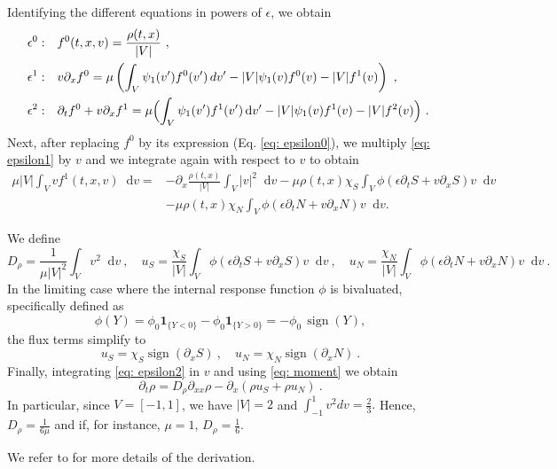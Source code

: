 \documentclass[11pt,twoside]{article}
\theoremstyle{nonumberplain}
\DeclareMathOperator{\sign}{sign}
\newcommand*\diff{\mathop{}\!\mathrm{d}}
\begin{document}
\noindent Identifying the different equations in powers of $\epsilon$, we obtain
\fi
\begin{align}
    \epsilon^0: & \quad f^0(t,{x},{v})=\frac{\rho(t,{x})}{|V|}\ ,\label{eq: epsilon0}\\
    \epsilon^1: & \quad 
    v \partial_x f^0
=
\mu \left(
\int_V \psi_1(v') f^0(v')\,dv'
- |V| \psi_1(v) f^0(v)
- |V| f^1(v)
\right)\ ,\label{eq: epsilon1}\\
    \epsilon^2: & \quad \partial_tf^0+{v}\partial_x f^1 =\mu\Bigl(\int_V\psi_1(v')f^1(v')\diff v'-|V|\psi_1(v)f^1(v)-|V|f^2(v)\Bigr) \ \label{eq: epsilon2}.\
\end{align}
Next, after replacing $f^0$ by its expression (Eq. \eqref{eq: epsilon0}), we multiply \eqref{eq: epsilon1} by ${v}$ and we integrate again with respect to ${v}$ to obtain
\begin{align}
    \mu|V|\int_V vf^1(t,x,v) \diff v=&-\partial_x\frac{\rho(t,x)}{|V|}\int_V |v|^2\diff v-\mu\rho(t,x)\chi_S\int_V\phi(\epsilon\partial_tS+v\partial_xS)v\diff v\nonumber\\ &-\mu\rho(t,x)\chi_N\int_V\phi(\epsilon\partial_tN+v\partial_xN)v\diff v.\label{eq: mean direction}
\end{align}

We define
\begin{equation}
D_\rho=\frac{1}{\mu|V|^2}\int_V v^2 \diff v\ ,\quad u_S=\frac{\chi_S}{|V|}\int_V\phi(\epsilon\partial_tS+v\partial_xS)v\diff v \ ,\quad u_N=\frac{\chi_N}{|V|}\int_V\phi(\epsilon\partial_tN+v\partial_xN)v\diff v\ .\label{eq: moment}\end{equation} 
In the limiting case where the internal response function $\phi$ is bivaluated, specifically defined as
\[
\phi(Y) = \phi_0 \mathbf{1}_{\{Y < 0\}} - \phi_0 \mathbf{1}_{\{Y > 0\}} = - \phi_0 \, \sign(Y),
\]
the flux terms simplify to
\begin{equation}
u_S= \chi_S\sign(\partial_x S)\ , \quad u_N=\chi_N \sign(\partial_x N)\ .
\end{equation}
Finally, integrating \eqref{eq: epsilon2} in ${v}$ and using \eqref{eq: moment} we obtain
\[
\partial_t\rho=D_\rho\partial_{xx}\rho-\partial_x(\rho u_S+\rho u_N)\ .
\]
In particular, since \( V = [-1,1] \), we have $|V|=2$ and $
\int_{-1}^1 v^2 dv = \frac{2}{3}.
$
Hence, $D_\rho=
\frac{1}{6\mu}$ and if, for instance, \( \mu = 1 \),
$D_\rho = \frac{1}{6}$.


We refer to \cite{emako2015existence,emako2016traveling} for more details of the derivation.
\end{document}
